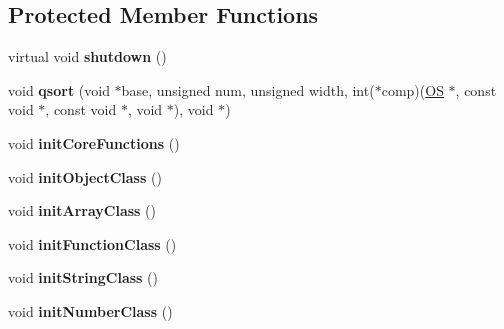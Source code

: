 \subsection*{Protected Member Functions}
\begin{DoxyCompactItemize}
\item 
virtual void {\bfseries shutdown} ()\hypertarget{class_object_script_1_1_o_s_a7e242648c2f130884c66e421404afc2a}{}\label{class_object_script_1_1_o_s_a7e242648c2f130884c66e421404afc2a}

\item 
void {\bfseries qsort} (void $\ast$base, unsigned num, unsigned width, int($\ast$comp)(\hyperlink{class_object_script_1_1_o_s}{OS} $\ast$, const void $\ast$, const void $\ast$, void $\ast$), void $\ast$)\hypertarget{class_object_script_1_1_o_s_a9cae560ece5b8d79edb3321b7b4f8308}{}\label{class_object_script_1_1_o_s_a9cae560ece5b8d79edb3321b7b4f8308}

\item 
void {\bfseries init\+Core\+Functions} ()\hypertarget{class_object_script_1_1_o_s_aa56677e86bd7fed50b7f2c5ff950b02a}{}\label{class_object_script_1_1_o_s_aa56677e86bd7fed50b7f2c5ff950b02a}

\item 
void {\bfseries init\+Object\+Class} ()\hypertarget{class_object_script_1_1_o_s_a2e65484fd07a7bb2d0b113a966d42df9}{}\label{class_object_script_1_1_o_s_a2e65484fd07a7bb2d0b113a966d42df9}

\item 
void {\bfseries init\+Array\+Class} ()\hypertarget{class_object_script_1_1_o_s_ac34f01483f95c6672a257c37c3999361}{}\label{class_object_script_1_1_o_s_ac34f01483f95c6672a257c37c3999361}

\item 
void {\bfseries init\+Function\+Class} ()\hypertarget{class_object_script_1_1_o_s_abbd9fc85cc185000519c0c3bc39b1c9e}{}\label{class_object_script_1_1_o_s_abbd9fc85cc185000519c0c3bc39b1c9e}

\item 
void {\bfseries init\+String\+Class} ()\hypertarget{class_object_script_1_1_o_s_ac6acaa0cefece06609d68b2d02a74291}{}\label{class_object_script_1_1_o_s_ac6acaa0cefece06609d68b2d02a74291}

\item 
void {\bfseries init\+Number\+Class} ()\hypertarget{class_object_script_1_1_o_s_a49e471790cdc1b48a138b080adffa219}{}\label{class_object_script_1_1_o_s_a49e471790cdc1b48a138b080adffa219}


\end{DoxyCompactItemize}
